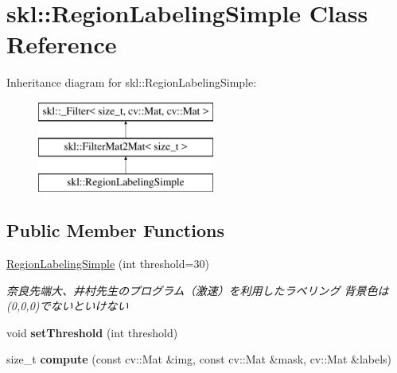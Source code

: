 \hypertarget{classskl_1_1_region_labeling_simple}{}\section{skl\+:\+:Region\+Labeling\+Simple Class Reference}
\label{classskl_1_1_region_labeling_simple}
Inheritance diagram for skl\+:\+:Region\+Labeling\+Simple\+:\begin{figure}[H]
\begin{center}
\leavevmode
\includegraphics[height=3.000000cm]{classskl_1_1_region_labeling_simple}
\end{center}
\end{figure}
\subsection*{Public Member Functions}
\begin{DoxyCompactItemize}
\item 
\hypertarget{classskl_1_1_region_labeling_simple_acb6a8ecc08c516e774eff602f9eda806}{}\label{classskl_1_1_region_labeling_simple_acb6a8ecc08c516e774eff602f9eda806} 
\hyperlink{classskl_1_1_region_labeling_simple_acb6a8ecc08c516e774eff602f9eda806}{Region\+Labeling\+Simple} (int threshold=30)
\begin{DoxyCompactList}\small\item\em 奈良先端大、井村先生のプログラム（激速）を利用したラベリング 背景色は(0,0,0)でないといけない \end{DoxyCompactList}\item 
\hypertarget{classskl_1_1_region_labeling_simple_a82849b764bb0a8b40dd7c863064d3b59}{}\label{classskl_1_1_region_labeling_simple_a82849b764bb0a8b40dd7c863064d3b59} 
void {\bfseries set\+Threshold} (int threshold)
\item 
\hypertarget{classskl_1_1_region_labeling_simple_a5e35c77b35dbb689aaf0d35fe3c49415}{}\label{classskl_1_1_region_labeling_simple_a5e35c77b35dbb689aaf0d35fe3c49415} 
size\+\_\+t {\bfseries compute} (const cv\+::\+Mat \&img, const cv\+::\+Mat \&mask, cv\+::\+Mat \&labels)
\end{DoxyCompactItemize}

